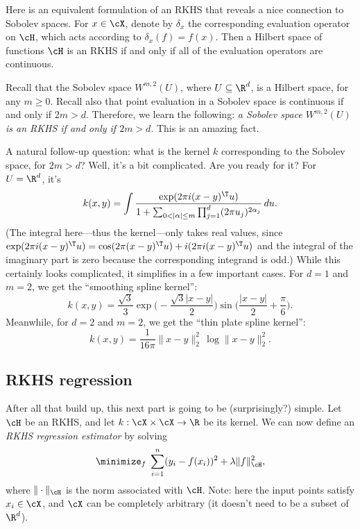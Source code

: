 \documentclass{article}
\begin{document}
Here is an equivalent formulation of an RKHS that reveals a nice connection to
Sobolev spaces. For $x \in \cX$, denote by $\delta_x$ the corresponding
evaluation operator on $\cH$, which acts according to $\delta_x(f) = f(x)$. Then
a Hilbert space of functions $\cH$ is an RKHS if and only if all of the
evaluation operators are continuous.  

Recall that the Sobolev space $W^{m,2}(U)$, where $U \subseteq \R^d$, is a
Hilbert space, for any $m \geq 0$. Recall also that point evaluation in a
Sobolev space is continuous if and only if $2m > d$. Therefore, we learn the
following: \emph{a Sobolev space $W^{m,2}(U)$ is an RKHS if and only if $2m >
  d$}. This is an amazing fact. 

A natural follow-up question: what is the kernel $k$ corresponding to the
Sobolev space, for $2m > d$? Well, it's a bit complicated. Are you ready for it?
For $U = \R^d$, it's
\[
k(x,y) = \int \frac{\exp(2\pi i (x-y)^\T u)}{1 + \sum_{0 < |\alpha| \leq m}
  \prod_{j=1}^d (2\pi u_j)^{2\alpha_j}} \, du.
\]
(The integral here---thus the kernel---only takes real values, since $\exp(2\pi
i (x-y)^\T u) = \cos(2\pi(x-y)^\T u) + i (2\pi i (x-y)^\T u)$ and the integral
of the imaginary part is zero because the corresponding integrand is odd.) While
this certainly looks complicated, it simplifies in a few important cases.    
For $d=1$ and $m=2$, we get the ``smoothing spline kernel'': 
\begin{equation}
\label{eq:ss_rkhs}
k(x,y) = \frac{\sqrt{3}}{3} \exp\bigg( -\frac{\sqrt{3}|x-y|}{2} \bigg) 
\sin\bigg( \frac{|x-y|}{2} + \frac{\pi}{6} \bigg).
\end{equation}
Meanwhile, for $d=2$ and $m=2$, we get the ``thin plate spline kernel'': 
\begin{equation}
\label{eq:tp_rkhs}
k(x,y) = \frac{1}{16 \pi} \|x-y\|_2^2 \, \log \|x-y\|_2^2.
\end{equation}

\subsection{RKHS regression}

After all that build up, this next part is going to be (surprisingly?)
simple. Let $\cH$ be an RKHS, and let $k : \cX \times \cX \to \R$ be its
kernel. We can now define an \emph{RKHS regression estimator} by solving 
\begin{equation}
\label{eq:rkhs}
\minimize_f \; \sum_{i=1}^n (y_i - f(x_i))^2 + \lambda \|f\|_\cH^2,
\end{equation}
where $\|\cdot\|_\cH$ is the norm associated with $\cH$. Note: here the input
points satisfy $x_i \in \cX$, and $\cX$ can be completely arbitrary (it doesn't
need to be a subset of $\R^d$). 
\end{document}
